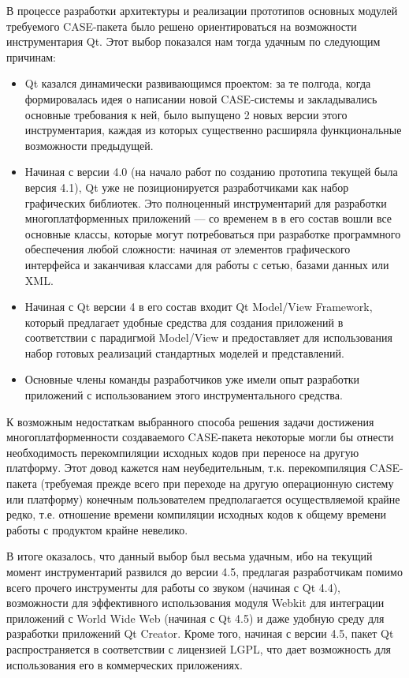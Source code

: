 \documentclass[a5paper]{article}
\begin{document}
В процессе разработки архитектуры и реализации прототипов основных
модулей требуемого CASE-пакета было решено
ориентироваться на возможности инструментария
Qt. Этот выбор показался нам тогда удачным
по следующим причинам:

\begin{itemize}
  \item Qt казался динамически развивающимся
	проектом: за те полгода, когда формировалась идея о написании новой
	CASE-системы и закладывались основные
	требования к ней, было выпущено 2 новых версии этого инструментария,
	каждая из которых существенно расширяла функциональные возможности
	предыдущей.
  \item 
	Начиная с версии 4.0 (на начало работ по созданию прототипа текущей была
	версия 4.1), Qt уже не позиционируется
	разработчиками как набор графических библиотек. Это полноценный
	инструментарий для разработки многоплатформенных приложений --- со
	временем в в его состав вошли все основные классы, которые могут
	потребоваться при разработке программного обеспечения любой сложности:
	начиная от элементов графического интерфейса и заканчивая классами для
	работы с сетью, базами данных или XML.
  \item Начиная с Qt версии 4 в его состав входит Qt Model/View
	Framework, который предлагает удобные
	средства для создания приложений в соответствии с парадигмой
	Model/View и предоставляет для использования набор готовых реализаций стандартных
	моделей и представлений.
  \item Основные члены команды разработчиков уже имели опыт разработки
	приложений с использованием этого инструментального средства.
\end{itemize}

К возможным недостаткам выбранного способа решения задачи достижения
многоплатформенности создаваемого CASE-пакета некоторые могли бы отнести
необходимость перекомпиляции исходных кодов при переносе на другую
платформу. Этот довод кажется нам неубедительным, т.к. перекомпиляция
CASE-пакета (требуемая прежде всего при переходе на другую операционную систему или платформу) конечным
пользователем предполагается осуществляемой крайне редко, т.е.
отношение времени компиляции исходных кодов к общему времени работы с
продуктом крайне невелико.

В итоге оказалось, что данный выбор был весьма удачным, ибо на текущий
момент инструментарий развился до версии 4.5, предлагая разработчикам
помимо всего прочего инструменты для работы со звуком (начиная с
Qt 4.4), возможности для эффективного использования модуля Webkit для интеграции
приложений с World Wide Web (начиная с Qt 4.5) и даже удобную среду для
разработки приложений Qt Creator. Кроме того, начиная с версии 4.5,
пакет Qt распространяется в соответствии с лицензией LGPL, что дает возможность для
использования его в коммерческих приложениях.
\end{document}
